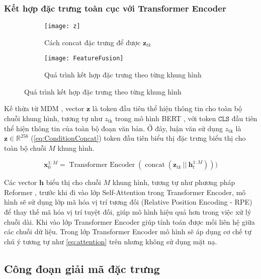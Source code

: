\subsubsection{Kết hợp đặc trưng toàn cục với Transformer Encoder}

\begin{figure}[H]
	\centering
	\begin{subfigure}{0.42\textwidth}
		\centering
		\texttt{[image: z]}
		\caption{Cách concat đặc trưng để được $\mathbf{z}_{tk}$}
		\label{fig:FeatureFusion}
	\end{subfigure}
	\hfill
	\begin{subfigure}{0.55\textwidth}
		\centering
		\texttt{[image: FeatureFusion]}
		\caption{Quá trình kết hợp đặc trưng theo từng khung hình}
		\label{fig:ZToken}
	\end{subfigure}
\end{figure}


Kế thừa từ MDM \cite{tevet2022human}, vector $\mathbf{z}$ là token đầu tiên thể hiện thông tin cho toàn bộ chuỗi khung hình, tương tự như  $z_{\text{tk}}$ trong mô hình BERT \cite{devlin2019bertpretrainingdeepbidirectional}, với token $\texttt{CLS}$ đầu tiên thể hiện thông tin của toàn bộ đoạn văn bản.
Ở đây, luận văn sử dụng $z_{\text{tk}}$ là $\mathbf{z} \in \mathbb{R}^{256}$ (\autoref{eq:ConditionConcat}) token đầu tiên biểu thị đặc trưng biểu thị cho toàn bộ chuỗi $M$ khung hình.

\begin{equation}
	\mathbf{x}^{1:M}_{0}  = \operatorname{Transformer\ Encoder}( \operatorname{concat}( \mathbf{z}_{tk} \ ||\  \mathbf{h}^{1:M}_{t}  )))
	\label{eq:TransformerEncoder}
\end{equation}


Các vector $\mathbf{h}$ biểu thị cho chuỗi $M$ khung hình, tương tự như phương pháp Reformer \cite{kitaev2020reformer}, trước khi đi vào lớp Self-Attention trong Transformer Encoder, mô hình sẽ sử dụng lớp mã hóa vị trí tương đối (Relative Position Encoding - RPE) để thay thế mã hóa vị trí tuyệt đối, giúp mô hình hiệu quả hơn trong việc xử lý chuỗi dài.
Khi vào lớp Transformer Encoder \cite{vaswani2017attention} giúp tính toán được mối liên hệ giữa các chuỗi dữ liệu. 
Trong lớp Transformer Encoder mô hình sẽ áp dụng cơ chế tự chú ý tương tự như \autoref{eq:attention} trên nhưng không sử dụng mặt nạ. 


\subsection{Công đoạn giải mã đặc trưng}

